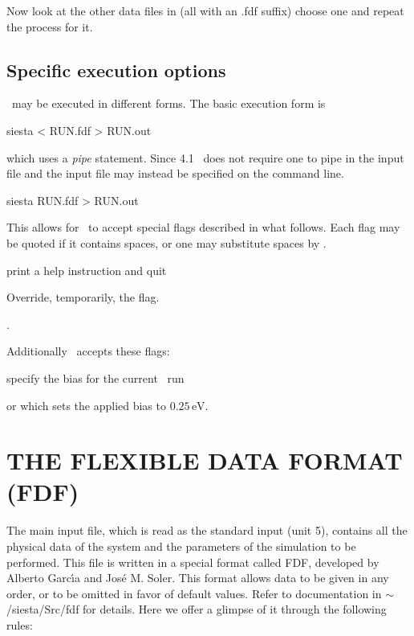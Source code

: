 Now look at the other data files in 
(all with an .fdf suffix) choose one and repeat the process for it.

\subsection{Specific execution options}

\siesta\ may be executed in different forms. The basic execution form
is
\begin{shellexample}
  siesta < RUN.fdf > RUN.out
\end{shellexample}
which uses a \emph{pipe} statement. 
%
Since 4.1 \siesta\ does not require one to pipe in the input file and
the input file may instead be specified on the command line.
\begin{shellexample}
  siesta RUN.fdf > RUN.out
\end{shellexample}
This allows for \siesta\ to accept special flags described in what
follows. Each flag may be quoted if it contains spaces, or one may
substitute spaces by \fdf*{:}.
\begin{fdfoptions}

  \option[-h]%
  print a help instruction and quit

  \option[-L]%
  Override, temporarily, the  flag. 

  .

\end{fdfoptions}
Additionally \tsiesta\ accepts these flags:
\begin{fdfoptions}

  \option[-V]%
  specify the bias for the current \tsiesta\ run

   or 
  which sets the applied bias to $0.25\,\mathrm{eV}$.

\end{fdfoptions}


\section{THE FLEXIBLE DATA FORMAT (FDF)}

The main input file,
which is read as the standard input (unit 5),
contains all the physical data of the system and the parameters of
the simulation to be performed.
This file is written in a special format called FDF, developed by
Alberto Garc\'{\i}a and Jos\'e M. Soler. This format allows data to be
given in any order, or to be omitted in favor of default values.
Refer to documentation in $\sim$/siesta/Src/fdf for details.
Here we offer a glimpse of it through the following rules:

